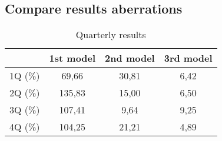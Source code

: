 \subsection{Compare results aberrations} \label{abbr}
\begin{table}[h!]
    \begin{center}
        \begin{tabular}{ | l | c | c | c |}
            \hline
            & \textbf{1st model} & \textbf{2nd model} & \textbf{3rd model}\\
            \hline
            1Q (\%) & 69,66 & 30,81 & 6,42\\
            2Q (\%) & 135,83 & 15,00 & 6,50\\
            3Q (\%) & 107,41 & 9,64 & 9,25\\
            4Q (\%) & 104,25 & 21,21 & 4,89\\
            \hline
        \end{tabular}
    \end{center}
    \caption{Quarterly results}
    \label{qResults}
\end{table}
\newpage

